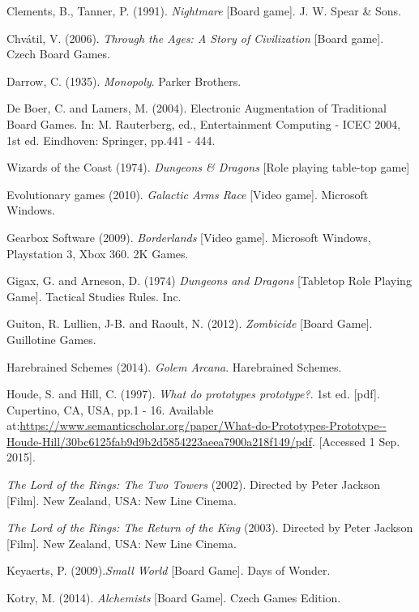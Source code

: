\documentclass[a4paper,11pt]{report}
\begin{document}
\begin{thebibliography}{1}
Clements, B., Tanner, P. (1991). \textit{Nightmare} [Board game]. J. W. Spear \& Sons.

Chvátil, V. (2006). \textit{Through the Ages: A Story of Civilization} [Board game]. Czech Board Games.

Darrow, C. (1935). \textit{Monopoly}. Parker Brothers.

De Boer, C. and Lamers, M. (2004). Electronic Augmentation of Traditional Board Games. In: M. Rauterberg, ed., Entertainment Computing - ICEC 2004, 1st ed. Eindhoven: Springer, pp.441 - 444.

Wizards of the Coast (1974). \textit{Dungeons \& Dragons} [Role playing table-top game]

Evolutionary games (2010). \textit{Galactic Arms Race} [Video game]. Microsoft Windows. 

Gearbox Software (2009). \textit{Borderlands} [Video game]. Microsoft Windows, Playstation 3, Xbox 360. 2K Games.

Gigax, G. and Arneson, D. (1974) \textit{Dungeons and Dragons} [Tabletop Role Playing Game]. Tactical Studies Rules. Inc.

Guiton, R. Lullien, J-B. and Raoult, N. (2012). \textit{Zombicide} [Board Game]. Guillotine Games.

Harebrained Schemes (2014). \textit{Golem Arcana}. Harebrained Schemes.

Houde, S. and Hill, C. (1997). \textit{What do prototypes prototype?}. 1st ed. [pdf]. Cupertino, CA, USA, pp.1 - 16. Available at:\url{https://www.semanticscholar.org/paper/What-do-Prototypes-Prototype--Houde-Hill/30bc6125fab9d9b2d5854223aeea7900a218f149/pdf}. [Accessed 1 Sep. 2015].

\textit{The Lord of the Rings: The Two Towers} (2002). Directed by Peter Jackson [Film]. New Zealand, USA: New Line Cinema.

\textit{The Lord of the Rings: The Return of the King} (2003). Directed by Peter Jackson [Film]. New Zealand, USA: New Line Cinema.

Keyaerts, P. (2009).\textit{Small World} [Board Game]. Days of Wonder.

Kotry, M. (2014). \textit{Alchemists} [Board Game]. Czech Games Edition.


\end{thebibliography}
\end{document}
